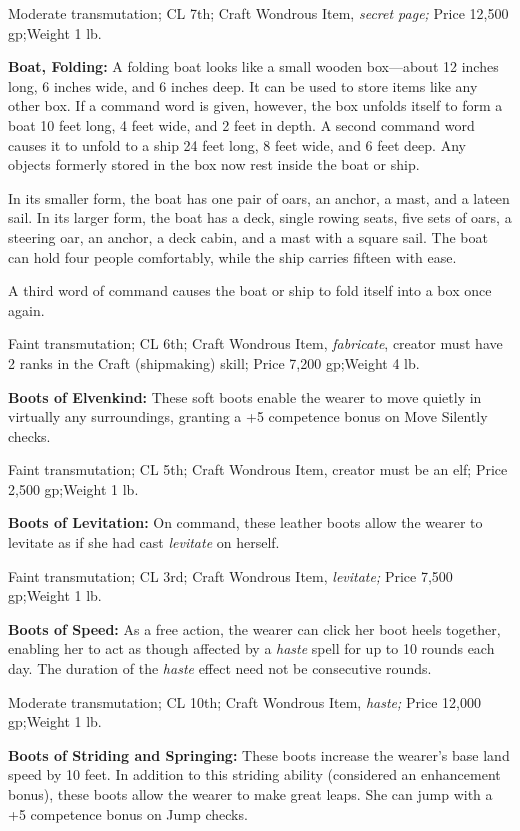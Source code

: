 Moderate transmutation; CL 7th; Craft Wondrous Item, \textit{secret page; }Price 
12,500 gp;Weight 1 lb.

\textbf{Boat, Folding:} A folding boat looks like a small wooden box---about 12 
inches long, 6 inches wide, and 6 inches deep. It can be used to store items like 
any other box. If a command word is given, however, the box unfolds itself to form 
a boat 10 feet long, 4 feet wide, and 2 feet in depth. A second command word causes 
it to unfold to a ship 24 feet long, 8 feet wide, and 6 feet deep. Any objects 
formerly stored in the box now rest inside the boat or ship.

In its smaller form, the boat has one pair of oars, an anchor, a mast, and a lateen 
sail. In its larger form, the boat has a deck, single rowing seats, five sets of 
oars, a steering oar, an anchor, a deck cabin, and a mast with a square sail. The 
boat can hold four people comfortably, while the ship carries fifteen with ease.

A third word of command causes the boat or ship to fold itself into a box once 
again.

Faint transmutation; CL 6th; Craft Wondrous Item, \textit{fabricate}, creator must 
have 2 ranks in the Craft (shipmaking) skill; Price 7,200 gp;Weight 4 lb.

\textbf{Boots of Elvenkind:} These soft boots enable the wearer to move quietly 
in virtually any surroundings, granting a +5 competence bonus on Move Silently 
checks.

Faint transmutation; CL 5th; Craft Wondrous Item, creator must be an elf; Price 
2,500 gp;Weight 1 lb.

\textbf{Boots of Levitation:} On command, these leather boots allow the wearer 
to levitate as if she had cast \textit{levitate }on herself.

Faint transmutation; CL 3rd; Craft Wondrous Item, \textit{levitate; }Price 7,500 
gp;Weight 1 lb.

\textbf{Boots of Speed:} As a free action, the wearer can click her boot heels 
together, enabling her to act as though affected by a \textit{haste }spell for 
up to 10 rounds each day. The duration of the \textit{haste }effect need not be 
consecutive rounds.

Moderate transmutation; CL 10th; Craft Wondrous Item, \textit{haste; }Price 12,000 
gp;Weight 1 lb.

\textbf{Boots of Striding and Springing:} These boots increase the wearer's base 
land speed by 10 feet. In addition to this striding ability (considered an enhancement 
bonus), these boots allow the wearer to make great leaps. She can jump with a +5 
competence bonus on Jump checks.


